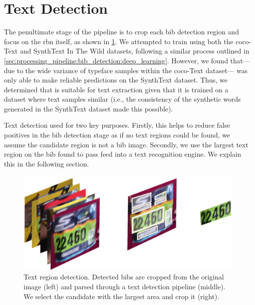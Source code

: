\section{Text Detection}

The penultimate stage of the pipeline is to crop each bib detection region and focus on the \gls{rbn} itself, as shown in \cref{fig:processing_pipeline:text_detection}. We attempted to train \frcnn{} using both the \gls{coco}-Text \citep{Veit:2016vj} and SynthText In The Wild \citep{Gupta:2016ws} datasets, following a similar process outlined in \cref{sec:processing_pipeline:bib_detection:deep_learning}. However, we found that---due to the wide variance of typeface samples within the \gls{coco}-Text dataset---\frcnn{} was only able to make reliable predictions on the SynthText dataset. Thus, we determined that \frcnn{} is suitable for text extraction given that it is trained on a dataset where text samples similar (i.e., the consistency of the synthetic words generated in the SynthText dataset made this possible).

Text detection used for two key purposes. Firstly, this helps to reduce false positives in the bib detection stage as if no text regions could be found, we assume the candidate region is not a bib image. Secondly, we use the largest text region on the bib found to pass feed into a text recognition engine. We explain this in the following section.

\begin{figure}[h]
  \centering
  \includegraphics[width=\textwidth]{images/processing/text_process}
  \caption[Text region detection pipeline]{Text region detection. Detected bibs are cropped from the original image (left) and parsed through a text detection pipeline (middle). We select the candidate with the largest area and crop it (right).}
  \label{fig:processing_pipeline:text_detection}
\end{figure}

